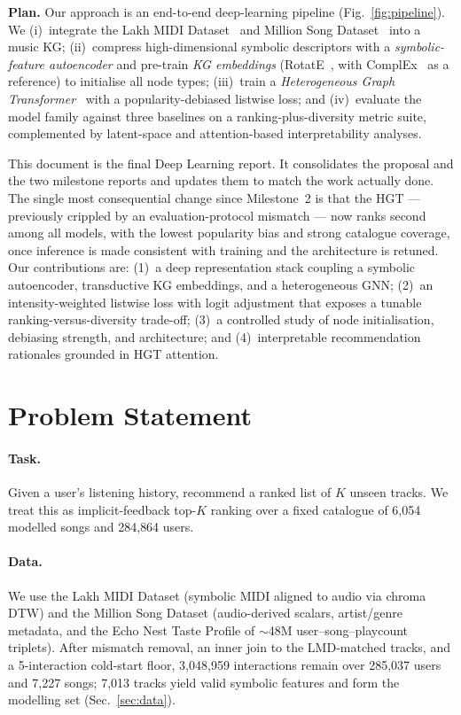 \documentclass[10pt,twocolumn,letterpaper]{article}
\begin{document}
\textbf{Plan.} Our approach is an end-to-end deep-learning pipeline (Fig.~\ref{fig:pipeline}).
We (i)~integrate the Lakh MIDI Dataset~\cite{raffel2016lakh} and Million Song
Dataset~\cite{msd2011} into a music KG; (ii)~compress high-dimensional symbolic
descriptors with a \emph{symbolic-feature autoencoder} and pre-train
\emph{KG embeddings} (RotatE~\cite{sun2019rotate}, with
ComplEx~\cite{trouillon2016complex} as a reference) to initialise all node types;
(iii)~train a \emph{Heterogeneous Graph Transformer}~\cite{hu2020hgt} with a
popularity-debiased listwise loss; and (iv)~evaluate the model family against three
baselines on a ranking-plus-diversity metric suite, complemented by latent-space
and attention-based interpretability analyses.

This document is the final Deep Learning report. It consolidates the proposal and
the two milestone reports and updates them to match the work actually done. The
single most consequential change since Milestone~2 is that the HGT --- previously
crippled by an evaluation-protocol mismatch --- now ranks second among all models,
with the lowest popularity bias and strong catalogue coverage, once inference is
made consistent with training and the architecture is retuned. Our contributions are: (1)~a deep representation stack coupling a
symbolic autoencoder, transductive KG embeddings, and a heterogeneous GNN;
(2)~an intensity-weighted listwise loss with logit adjustment that exposes a
tunable ranking-versus-diversity trade-off; (3)~a controlled study of node
initialisation, debiasing strength, and architecture; and (4)~interpretable
recommendation rationales grounded in HGT attention.

\section{Problem Statement}
\label{sec:problem}

\paragraph{Task.} Given a user's listening history, recommend a ranked list of
$K$ unseen tracks. We treat this as implicit-feedback top-$K$ ranking over a fixed
catalogue of 6{,}054 modelled songs and 284{,}864 users.

\paragraph{Data.} We use the Lakh MIDI Dataset (symbolic MIDI aligned to audio via
chroma DTW) and the Million Song Dataset (audio-derived scalars, artist/genre
metadata, and the Echo Nest Taste Profile of $\sim$48M user--song--playcount
triplets). After mismatch removal, an inner join to the LMD-matched tracks, and a
5-interaction cold-start floor, 3{,}048{,}959 interactions remain over 285{,}037
users and 7{,}227 songs; 7{,}013 tracks yield valid symbolic features and form the
modelling set (Sec.~\ref{sec:data}).
\end{document}
